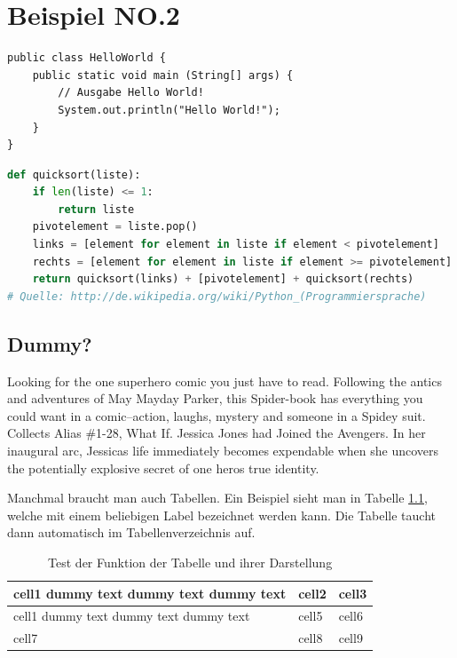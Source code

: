 
\chapter{Beispiel NO.2}


\begin{lstlisting}[caption=Code-Beispiel, label=Bsp.1]
public class HelloWorld {
	public static void main (String[] args) {
		// Ausgabe Hello World!
		System.out.println("Hello World!");
	}
}
\end{lstlisting}

\begin{lstlisting}[caption=Python-Code, label=Python-Code, title=Titel des Python-Codes,language=Python]
def quicksort(liste):
	if len(liste) <= 1:
		return liste
	pivotelement = liste.pop()
	links = [element for element in liste if element < pivotelement]
	rechts = [element for element in liste if element >= pivotelement]
	return quicksort(links) + [pivotelement] + quicksort(rechts)
# Quelle: http://de.wikipedia.org/wiki/Python_(Programmiersprache)
\end{lstlisting}

\section{Dummy?}
Looking for the one superhero comic you just have to read. Following the antics and adventures of May Mayday Parker, this Spider-book has everything you could want in a comic--action, laughs, mystery and someone in a Spidey suit. Collects Alias \#1-28, What If. Jessica Jones had Joined the Avengers. In her inaugural arc, Jessicas life immediately becomes expendable when she uncovers the potentially explosive secret of one heros true identity. 

Manchmal braucht man auch Tabellen. Ein Beispiel sieht man in Tabelle \ref{tabelle1}, welche mit einem beliebigen Label bezeichnet werden kann. Die Tabelle taucht dann automatisch im Tabellenverzeichnis auf.

\begin{table}[h!]
\begin{center}
\begin{tabular}{ | m{5cm} | m{1cm}| m{1cm} | } 
\hline
cell1 dummy text dummy text dummy text& cell2 & cell3 \\ 
\hline
cell1 dummy text dummy text dummy text & cell5 & cell6 \\ 
\hline
cell7 & cell8 & cell9 \\ 
\hline
\end{tabular}
\end{center}
\caption{Test der Funktion der Tabelle und ihrer Darstellung}
\label{tabelle1}
\end{table}


